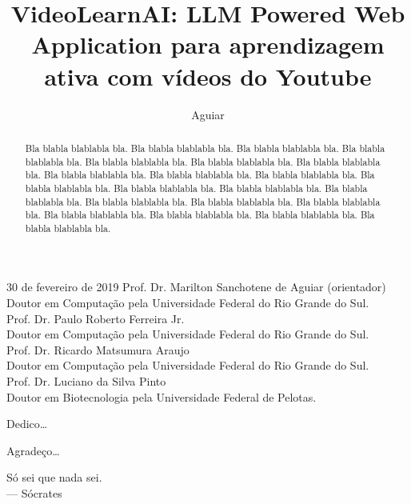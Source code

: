 \documentclass[tcc,capa]{texufpel}
\title{VideoLearnAI: LLM Powered Web Application para aprendizagem ativa com vídeos do Youtube}
\author{Aguiar}{Marilton Sanchotene de}
\begin{document}

\maketitle 

\sloppy

\fichacatalografica


\begin{aprovacao}{30 de fevereiro de 2019} %
\noindent Prof. Dr. Marilton Sanchotene de Aguiar (orientador)\\
Doutor em Computação pela Universidade Federal do Rio Grande do Sul.\\[1cm]

\noindent Prof. Dr. Paulo Roberto Ferreira Jr.\\
Doutor em Computação pela Universidade Federal do Rio Grande do Sul.\\[1cm]

\noindent Prof. Dr. Ricardo Matsumura Araujo\\
Doutor em Computação pela Universidade Federal do Rio Grande do Sul.\\[1cm]

\noindent Prof. Dr. Luciano da Silva Pinto\\
Doutor em Biotecnologia pela Universidade Federal de Pelotas.
\end{aprovacao}

\begin{dedicatoria}
  Dedico\ldots 
\end{dedicatoria}

\begin{agradecimentos}
  Agradeço\ldots 
\end{agradecimentos}

\begin{epigrafe}
  Só sei que nada sei.\\
  {\sc --- Sócrates}
\end{epigrafe}

\begin{abstract}
Bla blabla blablabla bla.  Bla blabla blablabla bla.  Bla blabla
blablabla bla.  Bla blabla blablabla bla.  Bla blabla blablabla bla.
Bla blabla blablabla bla.  Bla blabla blablabla bla.  Bla blabla
blablabla bla.  Bla blabla blablabla bla.  Bla blabla blablabla bla.
Bla blabla blablabla bla.  Bla blabla blablabla bla.  Bla blabla
blablabla bla.  Bla blabla blablabla bla.  Bla blabla blablabla bla.
Bla blabla blablabla bla.  Bla blabla blablabla bla.  Bla blabla
blablabla bla.  Bla blabla blablabla bla.  Bla blabla blablabla bla.
Bla blabla blablabla bla.
\end{abstract}
\end{document}
